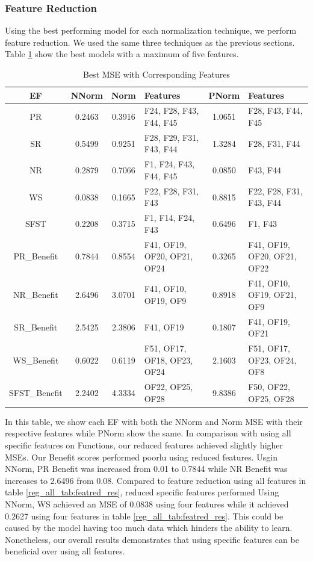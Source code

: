 \documentclass[12pt,letterpaper]{article}
\begin{document}
\subsubsection{Feature Reduction}
Using the best performing model for each normalization technique, we perform feature reduction.
We used the same three techniques as the previous sections.
Table \ref{reg_spec_tab:featred_res} show the best models with a maximum of five features.

\begin{table}[H]
\centering
\begin{tabular}{|c|c|c|p{2.5cm}|c|p{2.5cm}|}
\hline
\textbf{\ac{EF}} & \textbf{NNorm} & \textbf{Norm} & \textbf{Features} & \textbf{PNorm} & \textbf{Features} \\
\hline
PR & 0.2463 & 0.3916 & F24, F28, F43, F44, F45 & 1.0651 & F28, F43, F44, F45 \\
\hline
SR & 0.5499 & 0.9251 & F28, F29, F31, F43, F44 & 1.3284 & F28, F31, F44 \\
\hline
NR & 0.2879 & 0.7066 & F1, F24, F43, F44, F45 & 0.0850 & F43, F44 \\
\hline
WS & 0.0838 & 0.1665 & F22, F28, F31, F43 & 0.8815 & F22, F28, F31, F43, F44 \\
\hline
SFST & 0.2208 & 0.3715 & F1, F14, F24, F43 & 0.6496 & F1, F43 \\
\hline
PR\_Benefit & 0.7844 & 0.8554 & F41, OF19, OF20, OF21, OF24 & 0.3265 & F41, OF19, OF20, OF21, OF22 \\
\hline
NR\_Benefit & 2.6496 & 3.0701 & F41, OF10, OF19, OF9 & 0.8918 & F41, OF10, OF19, OF21, OF9 \\
\hline
SR\_Benefit & 2.5425 & 2.3806 & F41, OF19 & 0.1807 &  F41, OF19, OF21 \\
\hline
WS\_Benefit & 0.6022 & 0.6119 & F51, OF17, OF18, OF23, OF24 & 2.1603 & F51, OF17, OF23, OF24, OF8 \\
\hline
SFST\_Benefit & 2.2402 & 4.3334 & OF22, OF25, OF28 & 9.8386 & F50, OF22, OF25, OF28 \\
\hline
\end{tabular}
\caption{Best MSE with Corresponding Features}
\label{reg_spec_tab:featred_res}
\end{table}

In this table, we show each \ac{EF} with both the NNorm and Norm MSE with their respective features while PNorm show the same.
In comparison with using all specific features on Functions, our reduced features achieved slightly higher MSEs.
Our Benefit scores performed poorlu using reduced features.
Usgin NNorm, \ac{PR} Benefit was increased from 0.01 to 0.7844 while \ac{NR} Benefit was increases to 2.6496 from 0.08.
Compared to feature reduction using all features in table \ref{reg_all_tab:featred_res}, reduced specific features performed Using NNorm, \ac{WS} achieved an MSE of 0.0838 using four features while it achieved 0.2627 using four features in table \ref{reg_all_tab:featred_res}.
This could be caused by the model having too much data which hinders the ability to learn.
Nonetheless, our overall results demonstrates that using specific features can be beneficial over using all features.
\end{document}
